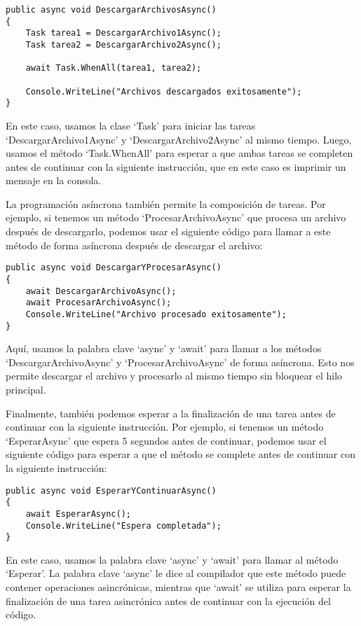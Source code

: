 \documentclass[executivepaper]{article}
\begin{document}
\begin{lstlisting}
public async void DescargarArchivosAsync()
{
    Task tarea1 = DescargarArchivo1Async();
    Task tarea2 = DescargarArchivo2Async();
    
    await Task.WhenAll(tarea1, tarea2);
    
    Console.WriteLine("Archivos descargados exitosamente");
}   
\end{lstlisting}

En este caso, usamos la clase \enquote*{Task} para iniciar las tareas \enquote*{DescargarArchivo1Async} y \enquote*{DescargarArchivo2Async} al mismo tiempo. Luego, usamos el método \enquote*{Task.WhenAll} para esperar a que ambas tareas se completen antes de continuar con la siguiente instrucción, que en este caso es imprimir un mensaje en la consola.

La programación asíncrona también permite la composición de tareas. Por ejemplo, si tenemos un método \enquote*{ProcesarArchivoAsync} que procesa un archivo después de descargarlo, podemos usar el siguiente código para llamar a este método de forma asíncrona después de descargar el archivo:

\begin{lstlisting}
public async void DescargarYProcesarAsync()
{
    await DescargarArchivoAsync();
    await ProcesarArchivoAsync();
    Console.WriteLine("Archivo procesado exitosamente");
}
\end{lstlisting}

Aquí, usamos la palabra clave \enquote*{async} y \enquote*{await} para llamar a los métodos \enquote*{DescargarArchivoAsync} y \enquote*{ProcesarArchivoAsync} de forma asíncrona. Esto nos permite descargar el archivo y procesarlo al mismo tiempo sin bloquear el hilo principal.

Finalmente, también podemos esperar a la finalización de una tarea antes de continuar con la siguiente instrucción. Por ejemplo, si tenemos un método \enquote*{EsperarAsync} que espera 5 segundos antes de continuar, podemos usar el siguiente código para esperar a que el método se complete antes de continuar con la siguiente instrucción:

\begin{lstlisting}
public async void EsperarYContinuarAsync()
{
    await EsperarAsync();
    Console.WriteLine("Espera completada");
}    
\end{lstlisting}

En este caso, usamos la palabra clave \enquote*{async} y \enquote*{await} para llamar al método \enquote*{Esperar}. La palabra clave \enquote*{async} le dice al compilador que este método puede contener operaciones asincrónicas, mientras que \enquote*{await} se utiliza para esperar la finalización de una tarea asincrónica antes de continuar con la ejecución del código.
\end{document}
